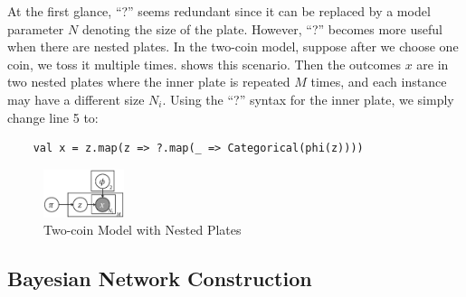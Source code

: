 At the first glance, ``?'' seems redundant since it can be replaced by a
model parameter $N$ denoting the size of the plate.  However, ``?'' becomes
more useful when there are nested plates. In the two-coin model, suppose
after we choose one coin, we toss it multiple times. 
 shows this scenario.
Then the outcomes $x$ are in two nested plates where the inner plate is
repeated $M$ times, and each instance may have
a different size $N_i$. Using the ``?'' syntax
for the inner plate, we simply change line 5 to:

{\small\begin{verbatim}
	val x = z.map(z => ?.map(_ => Categorical(phi(z))))	
\end{verbatim}
}

\begin{figure}[th]
	\centering
	\includegraphics[width=0.21\textwidth]{figs/two_coins_nestedplates}
    \vspace*{-10pt}
	\caption{Two-coin Model with Nested Plates}
	\label{fig:two_coins_nestedplates}
\end{figure}

\subsection{Bayesian Network Construction}


